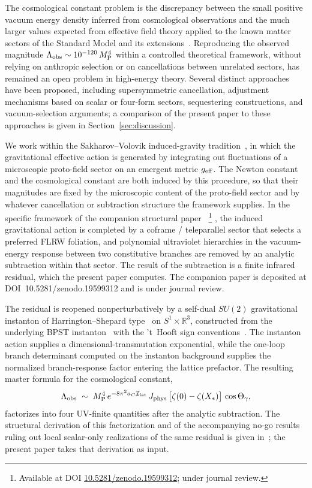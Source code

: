 \documentclass[a4paper,11pt]{article}
\theoremstyle{definition}
\newcommand{\MP}{M_{\rm P}}
\newcommand{\Lobs}{\Lambda_{\rm obs}}
\newcommand{\Ilat}{\mathcal{I}_{\rm lat}}
\newcommand{\Jphys}{J_{\rm phys}}
\newcommand{\bR}{\mathbb{R}}
\begin{document}
The cosmological constant problem is the discrepancy between the
small positive vacuum energy density inferred from cosmological
observations and the much larger values expected from effective
field theory applied to the known matter sectors of the Standard
Model and its
extensions~\cite{Weinberg89,Carroll01,Padmanabhan03,Martin12}.
Reproducing the observed magnitude
$\Lobs \sim 10^{-120}\,\MP^4$ within a controlled theoretical
framework, without relying on anthropic selection or on
cancellations between unrelated sectors, has remained an open
problem in high-energy theory. Several distinct approaches have
been proposed, including supersymmetric cancellation, adjustment
mechanisms based on scalar or four-form sectors, sequestering
constructions, and vacuum-selection arguments; a comparison of
the present paper to these approaches is given in
Section~\ref{sec:discussion}.

We work within the Sakharov--Volovik induced-gravity
tradition~\cite{Sakharov67,Visser02,Volovik03,Volovik2001}, in
which the gravitational effective action is generated by
integrating out fluctuations of a microscopic proto-field sector
on an emergent metric $g_{\rm eff}$. The Newton constant and the
cosmological constant are both induced by this procedure, so that
their magnitudes are fixed by the microscopic content of the
proto-field sector and by whatever cancellation or subtraction
structure the framework supplies. In the specific framework of
the companion structural paper~\cite{companion-structural}%
\footnote{Available at DOI \href{https://doi.org/10.5281/zenodo.19599312}{10.5281/zenodo.19599312}; under journal review.}%
, the
induced gravitational action is completed by a coframe /
teleparallel sector that selects a preferred FLRW foliation, and
polynomial ultraviolet hierarchies in the vacuum-energy response
between two constitutive branches are removed by an analytic
subtraction within that sector. The result of the subtraction is
a finite infrared residual, which the present paper computes. The companion paper is deposited at DOI~10.5281/zenodo.19599312 and
is under journal review.

The residual is reopened nonperturbatively by a self-dual $SU(2)$
gravitational instanton of Harrington--Shepard
type~\cite{HS1978} on $S^1 \times \bR^3$, constructed from
the underlying BPST instanton~\cite{BPST1975} with the 't~Hooft
sign conventions~\cite{tHooft1976}. The
instanton action supplies a dimensional-transmutation
exponential, while the one-loop branch determinant computed on
the instanton background supplies the normalized branch-response
factor entering the lattice prefactor. The resulting master
formula for the cosmological constant,
\begin{equation*}
\Lobs \;\sim\;
\MP^4\,e^{-8\pi^2 a_C \Ilat}\,
\Jphys\,\bigl[\zeta(0) - \zeta(X_*)\bigr]\,\cos\Theta_\gamma,
\end{equation*}
factorizes into four UV-finite quantities after the analytic
subtraction. The structural derivation of this factorization and
of the accompanying no-go results ruling out local scalar-only
realizations of the same residual is given
in~\cite{companion-structural}; the present paper takes that
derivation as input.
\end{document}
